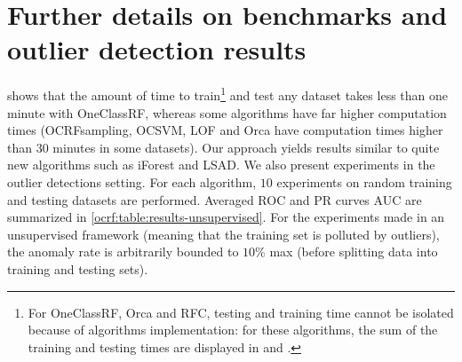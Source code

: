 \section{Further details on benchmarks and outlier detection results}
\label{sup:outlier_detection}


 shows that the amount of time to
train\footnote{For \ac{OneClassRF}, Orca and \ac{RFC}, testing and training
time cannot be isolated because of algorithms implementation: for these
algorithms, the sum of the training and testing times are displayed in
 and .}
and test any dataset takes less than one minute with \ac{OneClassRF}, whereas
some algorithms have far higher computation times (\ac{OCRFsampling},
\ac{OCSVM}, \ac{LOF} and Orca have computation times higher than $30$ minutes
in some datasets). Our approach yields results similar to quite new algorithms
such as \ac{iForest} and \ac{LSAD}.
We also present experiments in the outlier detections setting. For each
algorithm, $10$ experiments on random training and testing datasets are
performed. Averaged \acs{ROC} and \acs{PR} curves \acs{AUC} are summarized in
\cref{ocrf:table:results-unsupervised}.
%
For the experiments made in an unsupervised framework (meaning that the
training set is polluted by outliers), the anomaly rate is arbitrarily bounded
to $10\%$ max (before splitting data into training and testing sets).
